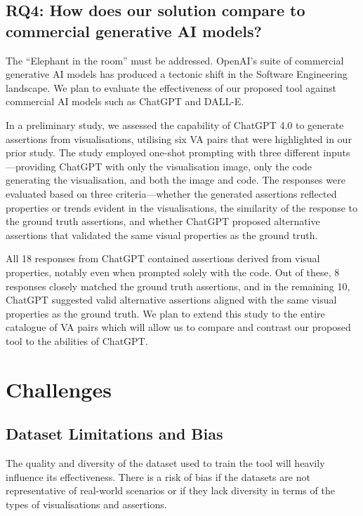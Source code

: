 \documentclass[sigconf]{acmart}
\begin{document}
\subsection{RQ4: How does our solution compare to commercial
generative AI models?}

The ``Elephant in the room'' must be addressed. OpenAI's suite of
commercial generative AI models has produced a tectonic shift in the
Software Engineering landscape. We plan to evaluate the effectiveness
of our proposed tool against commercial AI models such as ChatGPT and
DALL-E.

In a preliminary study, we assessed the capability of ChatGPT 4.0 to
generate assertions from visualisations, utilising six VA pairs that
were highlighted in our prior study. The study employed one-shot
prompting with three different inputs---providing ChatGPT with only
the visualisation image, only the code generating the visualisation,
and both the image and code. The responses were evaluated based on
three criteria---whether the generated assertions reflected properties
or trends evident in the visualisations, the similarity of the
response to the ground truth assertions, and whether ChatGPT proposed
alternative assertions that validated the same visual properties as
the ground truth.

All 18 responses from ChatGPT contained assertions derived from visual
properties, notably even when prompted solely with the code. Out of
these, 8 responses closely matched the ground truth assertions, and in
the remaining 10, ChatGPT suggested valid alternative assertions
aligned with the same visual properties as the ground truth. We plan
to extend this study to the entire catalogue of VA pairs which will
allow us to compare and contrast our proposed tool to the abilities of
ChatGPT.

\section{Challenges}

\subsection{Dataset Limitations and Bias}

The quality and diversity of the dataset used to train the tool will
heavily influence its effectiveness. There is a risk of bias if the
datasets are not representative of real-world scenarios or if they
lack diversity in terms of the types of visualisations and assertions.
\end{document}
